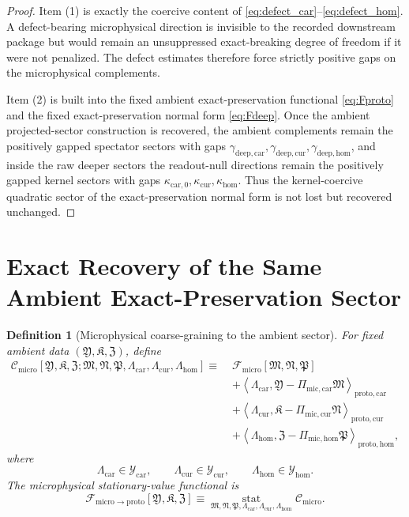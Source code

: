 \documentclass[11pt]{article}
\newcommand{\PreCarGap}{\kappa_{\mathrm{car},0}}
\newcommand{\CurrentGap}{\kappa_{\mathrm{cur}}}
\newcommand{\HomGap}{\kappa_{\mathrm{hom}}}
\newcommand{\ProtoTensorClass}{\mathscr Y_{\mathrm{car}}}
\newcommand{\ProtoRelabelClass}{\mathscr Y_{\mathrm{cur}}}
\newcommand{\ProtoFreeClass}{\mathscr Y_{\mathrm{hom}}}
\newcommand{\ProtoTensor}{\mathfrak Y}
\newcommand{\ProtoRelabel}{\mathfrak K}
\newcommand{\ProtoFree}{\mathfrak Z}
\newcommand{\ProtoCarGap}{\gamma_{\mathrm{deep,car}}}
\newcommand{\ProtoCurGap}{\gamma_{\mathrm{deep,cur}}}
\newcommand{\ProtoHomGap}{\gamma_{\mathrm{deep,hom}}}
\newcommand{\UltraFunctional}{\mathscr F_{\mathrm{micro}}}
\newcommand{\UltraToProto}{\mathscr F_{\mathrm{micro}\to\mathrm{proto}}}
\newcommand{\UltraTensor}{\mathfrak M}
\newcommand{\UltraRelabel}{\mathfrak N}
\newcommand{\UltraFree}{\mathfrak P}
\newcommand{\UltraCarProj}{\Pi_{\mathrm{mic,car}}}
\newcommand{\UltraCurProj}{\Pi_{\mathrm{mic,cur}}}
\newcommand{\UltraHomProj}{\Pi_{\mathrm{mic,hom}}}
\newtheorem{definition}{Definition}
\begin{document}
\begin{proof}
Item (1) is exactly the coercive content of \eqref{eq:defect_car}--\eqref{eq:defect_hom}. A defect-bearing microphysical direction is invisible to the recorded downstream package but would remain an unsuppressed exact-breaking degree of freedom if it were not penalized. The defect estimates therefore force strictly positive gaps on the microphysical complements.

Item (2) is built into the fixed ambient exact-preservation functional \eqref{eq:Fproto} and the fixed exact-preservation normal form \eqref{eq:Fdeep}. Once the ambient projected-sector construction is recovered, the ambient complements remain the positively gapped spectator sectors with gaps \(\ProtoCarGap,\ProtoCurGap,\ProtoHomGap\), and inside the raw deeper sectors the readout-null directions remain the positively gapped kernel sectors with gaps \(\PreCarGap,\CurrentGap,\HomGap\). Thus the kernel-coercive quadratic sector of the exact-preservation normal form is not lost but recovered unchanged.
\end{proof}

\section{Exact Recovery of the Same Ambient Exact-Preservation Sector}

\begin{definition}[Microphysical coarse-graining to the ambient sector]
\label{def:Cultra}
For fixed ambient data \((\ProtoTensor,\ProtoRelabel,\ProtoFree)\), define
\begin{equation}
\begin{aligned}
\mathscr C_{\mathrm{micro}}
[\ProtoTensor,\ProtoRelabel,\ProtoFree;
\UltraTensor,\UltraRelabel,\UltraFree,
\Lambda_{\mathrm{car}},\Lambda_{\mathrm{cur}},\Lambda_{\mathrm{hom}}]
\equiv\;
&\UltraFunctional[\UltraTensor,\UltraRelabel,\UltraFree]
\\
&+\left\langle
\Lambda_{\mathrm{car}},
\ProtoTensor-\UltraCarProj\UltraTensor
\right\rangle_{\mathrm{proto,car}}
\\
&+\left\langle
\Lambda_{\mathrm{cur}},
\ProtoRelabel-\UltraCurProj\UltraRelabel
\right\rangle_{\mathrm{proto,cur}}
\\
&+\left\langle
\Lambda_{\mathrm{hom}},
\ProtoFree-\UltraHomProj\UltraFree
\right\rangle_{\mathrm{proto,hom}},
\end{aligned}
\label{eq:Cultra}
\end{equation}
where
\[
\Lambda_{\mathrm{car}}\in\ProtoTensorClass,\qquad
\Lambda_{\mathrm{cur}}\in\ProtoRelabelClass,\qquad
\Lambda_{\mathrm{hom}}\in\ProtoFreeClass.
\]
The microphysical stationary-value functional is
\begin{equation}
\UltraToProto[\ProtoTensor,\ProtoRelabel,\ProtoFree]
\equiv
\operatorname*{stat}_{\UltraTensor,\UltraRelabel,\UltraFree,\Lambda_{\mathrm{car}},\Lambda_{\mathrm{cur}},\Lambda_{\mathrm{hom}}}
\mathscr C_{\mathrm{micro}}.
\label{eq:Fultrastat}
\end{equation}
\end{definition}
\end{document}
